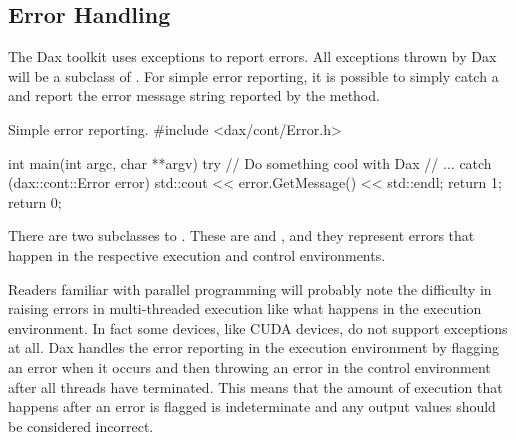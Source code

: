 
\subsection{Error Handling}
\label{sec:ErrorHandlingControl}


The Dax toolkit uses exceptions to report errors. All exceptions thrown by
Dax will be a subclass of . For simple error reporting, it
is possible to simply catch a  and report the error message
string reported by the  method.

\begin{daxexample}{Simple error reporting.}
#include <dax/cont/Error.h>

int main(int argc, char **argv)
{
  try
    {
    // Do something cool with Dax
    // ...
    }
  catch (dax::cont::Error error)
    {
    std::cout << error.GetMessage() << std::endl;
    return 1;
    }
  return 0;
}
\end{daxexample}

There are two subclasses to . These are
 and , and they represent
errors that happen in the respective execution and control environments.

Readers familiar with parallel programming will probably note the
difficulty in raising errors in multi-threaded execution like what happens
in the execution environment. In fact some devices, like CUDA devices, do
not support exceptions at all. Dax handles the error reporting in the
execution environment by flagging an error when it occurs and then throwing
an error in the control environment after all threads have terminated. This
means that the amount of execution that happens after an error is flagged
is indeterminate and any output values should be considered incorrect.

